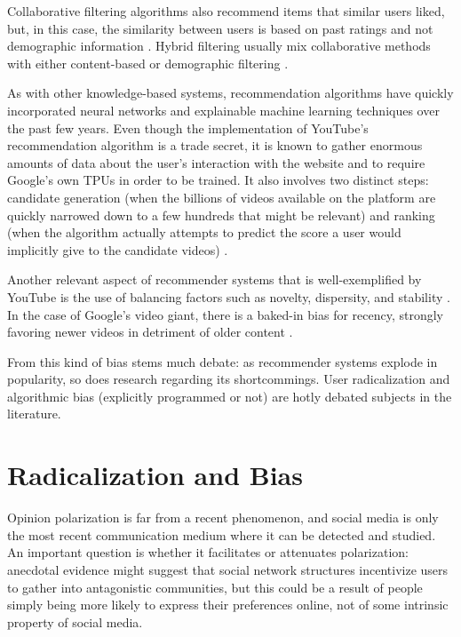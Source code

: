 Collaborative filtering algorithms also recommend items that similar users
liked, but, in this case, the similarity between users is based on past ratings
and not demographic information \citep{ricci_introduction_2011}. Hybrid
filtering usually mix collaborative methods with either content-based or
demographic filtering \citep{ricci_introduction_2011}.

As with other knowledge-based systems, recommendation algorithms have quickly
incorporated neural networks and explainable machine learning techniques over
the past few years. Even though the implementation of YouTube's recommendation
algorithm is a trade secret, it is known to gather enormous amounts of data
about the user's interaction with the website and to require Google's own TPUs
in order to be trained. It also involves two distinct steps: candidate
generation (when the billions of videos available on the platform are quickly
narrowed down to a few hundreds that might be relevant) and ranking (when the
algorithm actually attempts to predict the score a user would implicitly give to
the candidate videos) \citep{anonymous_improving_2022}.

Another relevant aspect of recommender systems that is well-exemplified by
YouTube is the use of balancing factors such as novelty, dispersity, and
stability \citep{zhao_recommending_2019}. In the case of Google's video giant,
there is a baked-in bias for recency, strongly favoring newer videos in
detriment of older content \citep{zhao_recommending_2019}.

From this kind of bias stems much debate: as recommender systems explode in
popularity, so does research regarding its shortcommings. User radicalization
and algorithmic bias (explicitly programmed or not) are hotly debated subjects
in the literature.

\section{Radicalization and Bias}
\label{sec:radicalization_bias}

Opinion polarization is far from a recent phenomenon, and social media is only
the most recent communication medium where it can be detected and studied. An
important question is whether it facilitates or attenuates polarization:
anecdotal evidence might suggest that social network structures incentivize
users to gather into antagonistic communities, but this could be a result of
people simply being more likely to express their preferences online, not of some
intrinsic property of social media.

